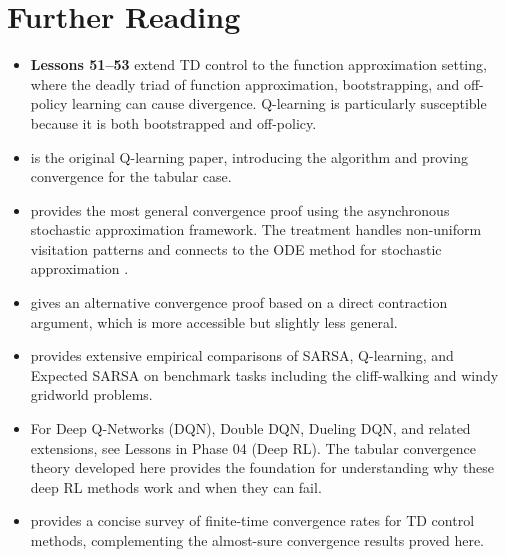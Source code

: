 \documentclass[11pt,a4paper]{article}
\begin{document}
\section{Further Reading}
\label{sec:further_reading}

\begin{itemize}
  \item \textbf{Lessons 51--53} extend TD control to the function
    approximation setting, where the deadly triad of function
    approximation, bootstrapping, and off-policy learning can cause
    divergence. Q-learning is particularly susceptible because it is
    both bootstrapped and off-policy.

  \item \citet{watkins1992} is the original Q-learning paper,
    introducing the algorithm and proving convergence for the
    tabular case.

  \item \citet{tsitsiklis1994} provides the most general convergence
    proof using the asynchronous stochastic approximation framework.
    The treatment handles non-uniform visitation patterns and
    connects to the ODE method for stochastic approximation
    \citep{borkar2008}.

  \item \citet{jaakkola1994} gives an alternative convergence proof
    based on a direct contraction argument, which is more accessible
    but slightly less general.

  \item \citet[Chapter 6]{suttonbarto2018} provides extensive
    empirical comparisons of SARSA, Q-learning, and Expected SARSA
    on benchmark tasks including the cliff-walking and windy
    gridworld problems.

  \item For Deep Q-Networks (DQN), Double DQN, Dueling DQN, and
    related extensions, see Lessons in Phase 04 (Deep RL). The
    tabular convergence theory developed here provides the
    foundation for understanding why these deep RL methods work
    and when they can fail.

  \item \citet[Section 4]{szepesvari2010} provides a concise
    survey of finite-time convergence rates for TD control methods,
    complementing the almost-sure convergence results proved here.
\end{itemize}


\end{document}
